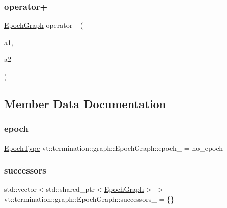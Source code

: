 \subsubsection{\texorpdfstring{operator+}{operator+}}
{\footnotesize\ttfamily \hyperlink{structvt_1_1termination_1_1graph_1_1_epoch_graph}{Epoch\+Graph} operator+ (\begin{DoxyParamCaption}\item[{\hyperlink{structvt_1_1termination_1_1graph_1_1_epoch_graph}{Epoch\+Graph}}]{a1,  }\item[{\hyperlink{structvt_1_1termination_1_1graph_1_1_epoch_graph}{Epoch\+Graph} const \&}]{a2 }\end{DoxyParamCaption})\hspace{0.3cm}{\ttfamily [friend]}}



\subsection{Member Data Documentation}
\mbox{\label{structvt_1_1termination_1_1graph_1_1_epoch_graph_a833365232980fd3e2ab084550c6efa20}} 
\subsubsection{\texorpdfstring{epoch\+\_\+}{epoch\_}}
{\footnotesize\ttfamily \hyperlink{namespacevt_a81d11b28122d43bf9834577e4a06440f}{Epoch\+Type} vt\+::termination\+::graph\+::\+Epoch\+Graph\+::epoch\+\_\+ = no\+\_\+epoch\hspace{0.3cm}{\ttfamily [private]}}

\mbox{\label{structvt_1_1termination_1_1graph_1_1_epoch_graph_ac30660eb1ec7ffc171da6d99b34513ee}} 
\subsubsection{\texorpdfstring{successors\+\_\+}{successors\_}}
{\footnotesize\ttfamily std\+::vector$<$std\+::shared\+\_\+ptr$<$\hyperlink{structvt_1_1termination_1_1graph_1_1_epoch_graph}{Epoch\+Graph}$>$ $>$ vt\+::termination\+::graph\+::\+Epoch\+Graph\+::successors\+\_\+ = \{\}\hspace{0.3cm}{\ttfamily [private]}}

